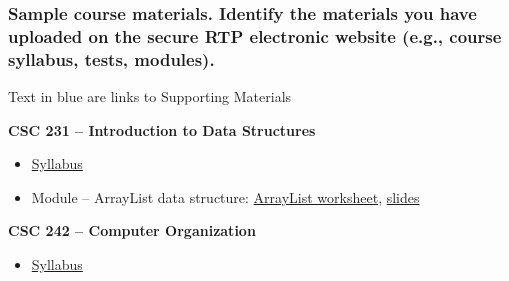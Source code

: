 \documentclass[10pt]{article}
\begin{document}
\subsubsection{Sample course materials. Identify the materials you have uploaded on the secure RTP electronic website (e.g., course syllabus, tests, modules).}
\begin{center}
	\color{blue} Text in blue are links to Supporting Materials
\end{center}

\newlength{\bulletindent}
\setlength{\bulletindent}{3.25cm}
\setlength{\parindent}{2.25cm}

\textbf{CSC 231 -- Introduction to Data Structures}
\setlength{\leftmargini}{\bulletindent}
\begin{itemize}
    \item \hyperref[CSC 231 Syllabus]{Syllabus}
    \item Module – ArrayList data structure: \hyperref[CSC 231 ArrayList Worksheet]{ArrayList worksheet}, \hyperref[CSC 231 ArrayList data structure - Stacks-Queues-Deques slides]{slides}
\end{itemize}

\vspace{1em}
\textbf{CSC 242 -- Computer Organization}
\begin{itemize}
    \item \hyperref[CSC 242 Syllabus]{Syllabus}
\end{itemize}
\end{document}
